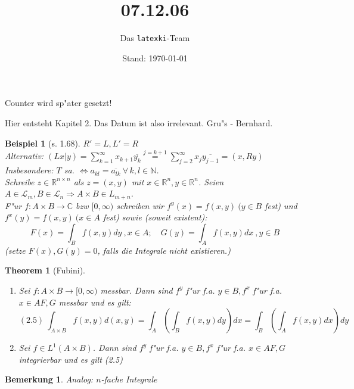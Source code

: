 \documentclass[a4paper,11pt]{book}
\title{07.12.06}
\author{Das \texttt{latexki}-Team\\[8 cm]}
\date{Stand: \today}
\newcommand{\R}{{\mathbb R}}
\newcommand{\C}{{\mathbb C}}
\newcommand{\N}{{\mathbb N}}
\newcommand{\ssL}{{\mathcal L}}
\newtheorem*{TheoNO}{Theorem}
\newtheorem*{BspNO}{Beispiel}
\newtheorem*{BemNO}{Bemerkung}
\theoremstyle{nonumberplain}
\begin{document}
Counter wird sp"ater gesetzt!

Hier entsteht Kapitel 2. Das Datum ist also irrelevant. Gru"s - Bernhard.\\

\begin{BspNO}[s. 1.68]
$R' = L, L' = R$\\
Alternativ: $(Lx|y) = \sum_{k=1}^{\infty} x_{k+1} \overline{y_k} \stackrel{j=k+1}{=} \sum_{j=2}^{\infty} x_j \overline{y_{j-1}} = (x,Ry)$\\
Insbesondere: $T$ sa. $\Leftrightarrow a_{kl} = \overline{a_{lk}} \ \forall\, k,l \in \N$.\\
Schreibe $z \in \R^{n \times n}$ als $z = (x,y)$ mit $x \in \R^n, y \in \R^n$. Seien $A \in \ssL_m, B \in \ssL_n \Rightarrow A \times B \in L_{m+n}$.\\
F"ur $f: A \times B \rightarrow \C$ bzw $[0,\infty)$ schreiben wir $f^y(x) = f(x,y) \ (y \in B$ fest) und $f^x(y) = f(x,y) \ (x \in A$ fest) sowie (soweit existent):
\[
F(x) = \int_B f(x,y)dy \ , x \in A; \quad G(y) = \int_A f(x,y)dx \ , y \in B
\]
(setze $F(x),G(y) = 0$, falls die Integrale nicht existieren.)
\end{BspNO}



\begin{TheoNO}[Fubini]
\begin{enumerate}
\item[a)] Sei $f: A \times B \rightarrow [0,\infty)$ messbar. Dann sind $f^y$ f"ur f.a. $y \in B, f^x$ f"ur f.a. $x \in A F,G$ messbar und es gilt:
\[
(2.5) \ \int_{A \times B} f(x,y)d(x,y) = \int_A ( \int_B f(x,y)dy)dx = \int_B ( \int_A f(x,y)dx)dy
\]

\item[b)] Sei $f \in L^1(A \times B)$. Dann sind $f^y$ f"ur f.a. $y \in B, f^x$ f"ur f.a. $x \in A F,G$ integrierbar und es gilt (2.5)
\end{enumerate}
\end{TheoNO}


\begin{BemNO}
Analog: $n$-fache Integrale
\end{BemNO}
\end{document}
